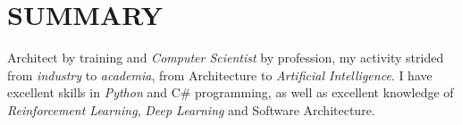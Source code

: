 \section*{SUMMARY}
    Architect by training and \emph{Computer Scientist} by profession, my activity strided from \emph{industry} to \emph{academia}, from Architecture to \emph{Artificial Intelligence}. I have excellent skills in \emph{Python} and C\# programming, as well as excellent knowledge of \emph{Reinforcement Learning}, \emph{Deep Learning} and Software Architecture.